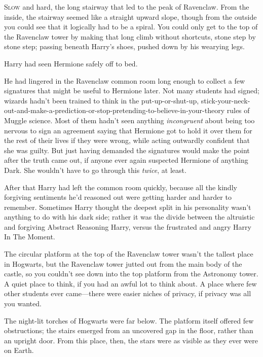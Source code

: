 
\lettrine{S}{low} and hard, the long stairway that led to the peak of Ravenclaw. From the inside, the stairway seemed like a straight upward slope, though from the outside you could see that it logically had to be a spiral. You could only get to the top of the Ravenclaw tower by making that long climb without shortcuts, stone step by stone step; passing beneath Harry's shoes, pushed down by his wearying legs.

Harry had seen Hermione safely off to bed.

He had lingered in the Ravenclaw common room long enough to collect a few signatures that might be useful to Hermione later. Not many students had signed; wizards hadn't been trained to think in the put-up-or-shut-up, stick-your-neck-out-and-make-a-prediction-or-stop-pretending-to-believe-in-your-theory rules of Muggle science. Most of them hadn't seen anything \emph{incongruent} about being too nervous to sign an agreement saying that Hermione got to hold it over them for the rest of their lives if they were wrong, while acting outwardly confident that she was guilty. But just having demanded the signatures would make the point after the truth came out, if anyone ever again suspected Hermione of anything Dark. She wouldn't have to go through this \emph{twice}, at least.

After that Harry had left the common room quickly, because all the kindly forgiving sentiments he'd reasoned out were getting harder and harder to remember. Sometimes Harry thought the deepest split in his personality wasn't anything to do with his dark side; rather it was the divide between the altruistic and forgiving Abstract Reasoning Harry, versus the frustrated and angry Harry In The Moment.

The circular platform at the top of the Ravenclaw tower wasn't the tallest place in Hogwarts, but the Ravenclaw tower jutted out from the main body of the castle, so you couldn't see down into the top platform from the Astronomy tower. A quiet place to think, if you had an awful lot to think about. A place where few other students ever came—there were easier niches of privacy, if privacy was all you wanted.

The night-lit torches of Hogwarts were far below. The platform itself offered few obstructions; the stairs emerged from an uncovered gap in the floor, rather than an upright door. From this place, then, the stars were as visible as they ever were on Earth.

